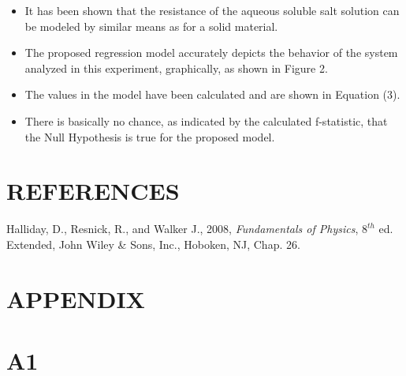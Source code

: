 \documentclass[12pt]{article}
\begin{document}
\begin{itemize}

\item It has been shown that the resistance of the aqueous soluble salt solution can be modeled by similar means as for a solid material.

\item The proposed regression model accurately depicts the behavior of the system analyzed in this experiment, graphically, as shown in Figure 2.

\item The values in the model have been calculated and are shown in Equation (3).

\item There is basically no chance, as indicated by the calculated f-statistic, that the Null Hypothesis is true for the proposed model.

\end{itemize}



\section*{\fontsize{12}{12}\selectfont REFERENCES}

\begin{thebibliography}{2}

Halliday, D., Resnick, R., and Walker J., 2008, \emph{Fundamentals of Physics}, $8^{th}$ ed. Extended, John Wiley \& Sons, Inc., Hoboken, NJ, Chap. 26.

\end{thebibliography}




\newpage


\section*{\fontsize{14}{14}\selectfont APPENDIX}

\hrulefill

\section*{\fontsize{12}{12}\selectfont A1}
\end{document}
